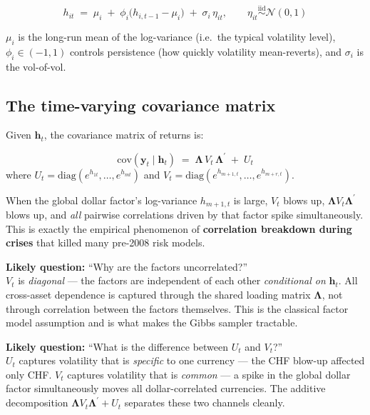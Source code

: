 \documentclass[11pt, a4paper]{article}\usepackage[]{graphicx}\usepackage[]{xcolor}
\newcommand{\stress}[1]{\textbf{#1}}
\begin{document}
\begin{formulabox}
\[
  h_{it} \;=\; \mu_i \;+\; \phi_i\bigl(h_{i,t-1} - \mu_i\bigr)
           \;+\; \sigma_i\, \eta_{it},
  \qquad \eta_{it} \overset{\mathrm{iid}}{\sim} \mathcal{N}(0,1)
\]
\end{formulabox}

$\mu_i$ is the long-run mean of the log-variance (i.e.\ the typical volatility
level), $\phi_i \in (-1,1)$ controls persistence (how quickly volatility
mean-reverts), and $\sigma_i$ is the vol-of-vol.

\subsection{The time-varying covariance matrix}

Given $\mathbf{h}_t$, the covariance matrix of returns is:

\begin{formulabox}
\[
  \mathrm{cov}(\mathbf{y}_t \mid \mathbf{h}_t)
  \;=\;
  \boldsymbol{\Lambda}\, V_t\, \boldsymbol{\Lambda}^\prime
  \;+\; U_t
\]
where $U_t = \mathrm{diag}(e^{h_{1t}},\ldots,e^{h_{mt}})$ and
$V_t = \mathrm{diag}(e^{h_{m+1,t}},\ldots,e^{h_{m+r,t}})$.
\end{formulabox}

When the global dollar factor's log-variance $h_{m+1,t}$ is large, $V_t$
blows up, $\boldsymbol{\Lambda} V_t \boldsymbol{\Lambda}^\prime$ blows up,
and \textit{all} pairwise correlations driven by that factor spike
simultaneously.  This is exactly the empirical phenomenon of
\stress{correlation breakdown during crises} that killed many pre-2008 risk
models.

\begin{remarkbox}
  \textbf{Likely question:} ``Why are the factors uncorrelated?''\\
  $V_t$ is \textit{diagonal} --- the factors are independent of each other
  \textit{conditional on} $\mathbf{h}_t$.  All cross-asset dependence is
  captured through the shared loading matrix $\boldsymbol{\Lambda}$, not
  through correlation between the factors themselves.  This is the classical
  factor model assumption and is what makes the Gibbs sampler tractable.
\end{remarkbox}

\begin{remarkbox}
  \textbf{Likely question:} ``What is the difference between $U_t$ and $V_t$?''\\
  $U_t$ captures volatility that is \textit{specific} to one currency ---
  the CHF blow-up affected only CHF.  $V_t$ captures volatility that is
  \textit{common} --- a spike in the global dollar factor simultaneously
  moves all dollar-correlated currencies.  The additive decomposition
  $\boldsymbol{\Lambda} V_t \boldsymbol{\Lambda}^\prime + U_t$ separates these
  two channels cleanly.
\end{remarkbox}
\end{document}
